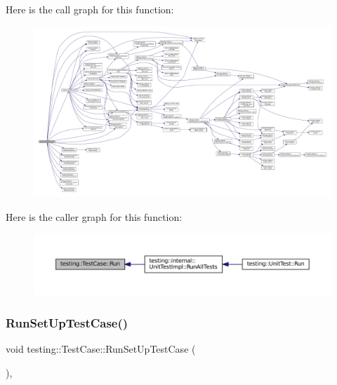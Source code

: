 Here is the call graph for this function\+:
\nopagebreak
\begin{figure}[H]
\begin{center}
\leavevmode
\includegraphics[width=350pt]{classtesting_1_1TestCase_a6f5b3724cd5a8e446cd48a6150d08cde_cgraph}
\end{center}
\end{figure}
Here is the caller graph for this function\+:
\nopagebreak
\begin{figure}[H]
\begin{center}
\leavevmode
\includegraphics[width=350pt]{classtesting_1_1TestCase_a6f5b3724cd5a8e446cd48a6150d08cde_icgraph}
\end{center}
\end{figure}
\mbox{\label{classtesting_1_1TestCase_a10763d318d617f921803741ec81919c5}} 
\subsubsection{\texorpdfstring{Run\+Set\+Up\+Test\+Case()}{RunSetUpTestCase()}}
{\footnotesize\ttfamily void testing\+::\+Test\+Case\+::\+Run\+Set\+Up\+Test\+Case (\begin{DoxyParamCaption}{ }\end{DoxyParamCaption})\hspace{0.3cm}{\ttfamily [inline]}, {\ttfamily [private]}}




